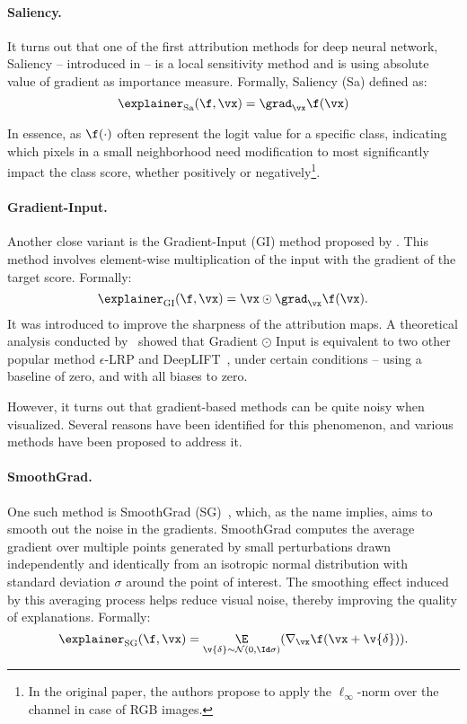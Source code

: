 \paragraph{Saliency.} It turns out that one of the first attribution methods for deep neural network, Saliency -- introduced in \cite{simonyan2013deep} -- is a local sensitivity method and is using absolute value of gradient as importance measure. Formally, Saliency (Sa) defined as:
$$
\explainer_{\text{Sa}}(\f, \vx) = \grad_{\vx} \f(\vx)
$$

In essence, as $\f(\cdot)$ often represent the logit value for a specific class, indicating which pixels in a small neighborhood need modification to most significantly impact the class score, whether positively or negatively\footnote{In the original paper, the authors propose to apply the $\ell_{\infty}$-norm over the channel in case of RGB images.}.

\paragraph{Gradient-Input.} Another close variant is the Gradient-Input (GI) method proposed by \cite{shrikumar2017learning}. This method involves element-wise multiplication of the input with the gradient of the target score. Formally:
$$
\explainer_{\text{GI}}(\f, \vx) = \vx \odot \grad_{\vx} \f(\vx).
$$
It was introduced to improve the sharpness of the attribution maps. A theoretical analysis conducted by~\cite{ancona2017better} showed that Gradient $\odot$ Input is equivalent to two other popular method $\epsilon$-LRP and DeepLIFT~\cite{shrikumar2017learning}, under certain conditions -- using a baseline of zero, and with all biases to zero. 

However, it turns out that gradient-based methods can be quite noisy when visualized. Several reasons have been identified for this phenomenon, and various methods have been proposed to address it. 

\paragraph{SmoothGrad.} One such method is SmoothGrad (SG)~\cite{smilkov2017smoothgrad}, which, as the name implies, aims to smooth out the noise in the gradients. SmoothGrad computes the average gradient over multiple points generated by small perturbations drawn independently and identically from an isotropic normal distribution with standard deviation $\sigma$ around the point of interest. The smoothing effect induced by this averaging process helps reduce visual noise, thereby improving the quality of explanations. Formally:
$$ 
\explainer_{\text{SG}}(\f, \vx) = \underset{\v{\delta} \sim \mathcal{N}(0, \Id\sigma)}{\E}(\nabla_{\vx} \f( \vx + \v{\delta}) ).
$$

